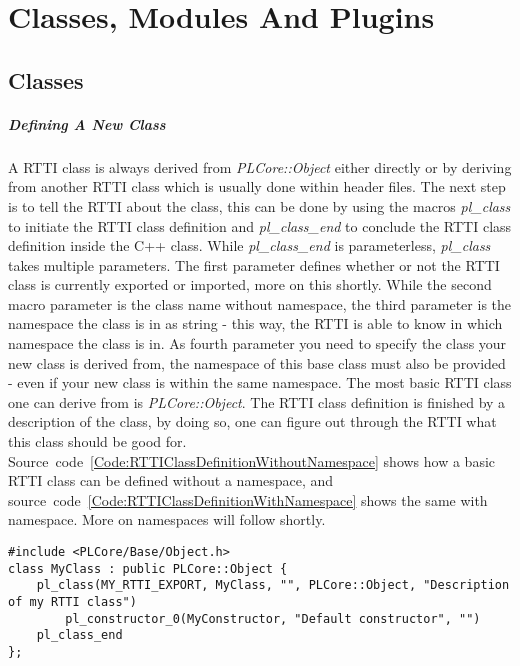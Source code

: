 \chapter{Classes, Modules And Plugins}
\label{Chapter:ClassesModulesAndPlugins}



\section{Classes}
\paragraph{Defining A New Class}
A RTTI class is always derived from \emph{PLCore::Object} either directly or by deriving from another RTTI class which is usually done within header files. The next step is to tell the RTTI about the class, this can be done by using the macros \emph{pl\_class} to initiate the RTTI class definition and \emph{pl\_class\_end} to conclude the RTTI class definition inside the C++ class. While \emph{pl\_class\_end} is parameterless, \emph{pl\_class} takes multiple parameters. The first parameter defines whether or not the RTTI class is currently exported or imported, more on this shortly. While the second macro parameter is the class name without namespace, the third parameter is the namespace the class is in as string - this way, the RTTI is able to know in which namespace the class is in. As fourth parameter you need to specify the class your new class is derived from, the namespace of this base class must also be provided - even if your new class is within the same namespace. The most basic RTTI class one can derive from is \emph{PLCore::Object}. The RTTI class definition is finished by a description of the class, by doing so, one can figure out through the RTTI what this class should be good for. Source~code~\ref{Code:RTTIClassDefinitionWithoutNamespace} shows how a basic RTTI class can be defined without a namespace, and source~code~\ref{Code:RTTIClassDefinitionWithNamespace} shows the same with namespace. More on namespaces will follow shortly.
\begin{lstlisting}[float=htb,label=Code:RTTIClassDefinitionWithoutNamespace,caption={Defining a new RTTI class without namespace}]
#include <PLCore/Base/Object.h>
class MyClass : public PLCore::Object {
	pl_class(MY_RTTI_EXPORT, MyClass, "", PLCore::Object, "Description of my RTTI class")
		pl_constructor_0(MyConstructor, "Default constructor", "")
	pl_class_end
};
\end{lstlisting}
